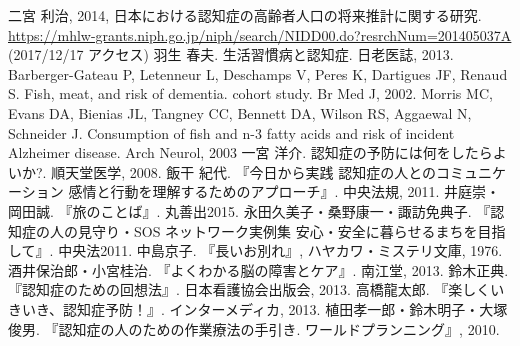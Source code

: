 \documentclass[openany,11pt,papersize]{jsbook}
\begin{document}

\begin{thebibliography}{9}
     二宮 利治, 2014, 日本における認知症の高齢者人口の将来推計に関する研究. \\ \url{https://mhlw-grants.niph.go.jp/niph/search/NIDD00.do?resrchNum=201405037A} (2017/12/17 アクセス)
     羽生 春夫. 生活習慣病と認知症. 日老医誌, 2013.
     Barberger-Gateau P, Letenneur L, Deschamps V, Peres K, Dartigues JF, Renaud S. Fish, meat, and risk of dementia. cohort study. Br Med J, 2002.
     Morris MC, Evans DA, Bienias JL, Tangney  CC, Bennett DA, Wilson RS, Aggaewal N, Schneider J. Consumption of fish and n-3 fatty acids and risk of incident Alzheimer disease. Arch Neurol, 2003
     一宮 洋介. 認知症の予防には何をしたらよいか?. 順天堂医学, 2008.
    \bibitem{} 飯干 紀代. 『今日から実践 認知症の人とのコミュニケーション 感情と行動を理解するためのアプローチ』. 中央法規, 2011.
    \bibitem{} 井庭崇・岡田誠. 『旅のことば』. 丸善出2015.
    \bibitem{} 永田久美子・桑野康一・諏訪免典子. 『認知症の人の見守り・SOS ネットワーク実例集 安心・安全に暮らせるまちを目指して』. 中央法2011.
    \bibitem{} 中島京子. 『長いお別れ』, ハヤカワ・ミステリ文庫, 1976.
    \bibitem{} 酒井保治郎・小宮桂治. 『よくわかる脳の障害とケア』. 南江堂, 2013.
    \bibitem{} 鈴木正典. 『認知症のための回想法』. 日本看護協会出版会, 2013.
    \bibitem{} 高橋龍太郎. 『楽しくいきいき、認知症予防！』. インターメディカ, 2013.
    \bibitem{} 植田孝一郎・鈴木明子・大塚俊男. 『認知症の人のための作業療法の手引き. ワールドプランニング』, 2010.
\end{thebibliography}
\end{document}
